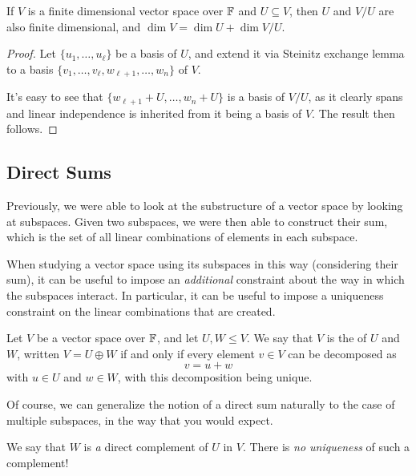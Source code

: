 \documentclass[a4paper]{scrartcl}
\begin{document}
\begin{proposition}
    If $V$ is a finite dimensional vector space over $\mathbb{F}$ and $U \subseteq V$, then $U$ and $V / U$ are also finite dimensional, and $\dim V = \dim U + \dim V / U$.
\end{proposition}
\begin{proof}
    Let $\{u_1, \dots, u_\ell\}$ be a basis of $U$, and extend it via Steinitz exchange lemma to a basis $\{v_1, \dots, v_\ell, w_{\ell+1}, \dots, w_n\}$ of $V$.

    It's easy to see that $\{w_{\ell + 1} + U, \dots, w_{n} + U\}$ is a basis of $V/U$, as it clearly spans and linear independence is inherited from it being a basis of $V$. The result then follows.
\end{proof}

\subsection{Direct Sums}

Previously, we were able to look at the substructure of a vector space by looking at subspaces. Given two subspaces, we were then able to construct their sum, which is the set of all linear combinations of elements in each subspace. 

When studying a vector space using its subspaces in this way (considering their sum), it can be useful to impose an \emph{additional} constraint about the way in which the subspaces interact. In particular, it can be useful to impose a uniqueness constraint on the linear combinations that are created.

\begin{definition}
    Let $V$ be a vector space over $\mathbb{F}$, and let $U, W \leq V$. We say that $V$ is the  of $U$ and $W$, written $V = U \oplus W$ if and only if every element $v \in V$ can be decomposed as
    $$
    v = u + w
    $$
    with $u \in U$ and $w \in W$, with this decomposition being unique.
\end{definition}

Of course, we can generalize the notion of a direct sum naturally to the case of multiple subspaces, in the way that you would expect.

\begin{remark}[Warning]
    We say that $W$ is \emph{a} direct complement of $U$ in $V$. There is \emph{no uniqueness} of such a complement!
\end{remark}
\end{document}
